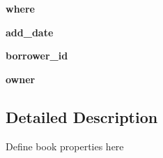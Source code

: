 \begin{DoxyCompactItemize}
\item 
\hypertarget{classsrc_1_1book_1_1book_aece0add811c470b756c188e293e0a2ab}{
{\bfseries where}}
\label{classsrc_1_1book_1_1book_aece0add811c470b756c188e293e0a2ab}

\item 
\hypertarget{classsrc_1_1book_1_1book_ab71c458e2c9726b81baea0c5f7fcb877}{
{\bfseries add\_\-date}}
\label{classsrc_1_1book_1_1book_ab71c458e2c9726b81baea0c5f7fcb877}

\item 
\hypertarget{classsrc_1_1book_1_1book_a7e00e9c2ccca8a87d8052e09c3c170ea}{
{\bfseries borrower\_\-id}}
\label{classsrc_1_1book_1_1book_a7e00e9c2ccca8a87d8052e09c3c170ea}

\item 
\hypertarget{classsrc_1_1book_1_1book_a93a494a297bc0f0f9e6cc2218bd3c2bd}{
{\bfseries owner}}
\label{classsrc_1_1book_1_1book_a93a494a297bc0f0f9e6cc2218bd3c2bd}

\end{DoxyCompactItemize}


\subsection{Detailed Description}
\begin{DoxyVerb}Define book properties here \end{DoxyVerb}
 

